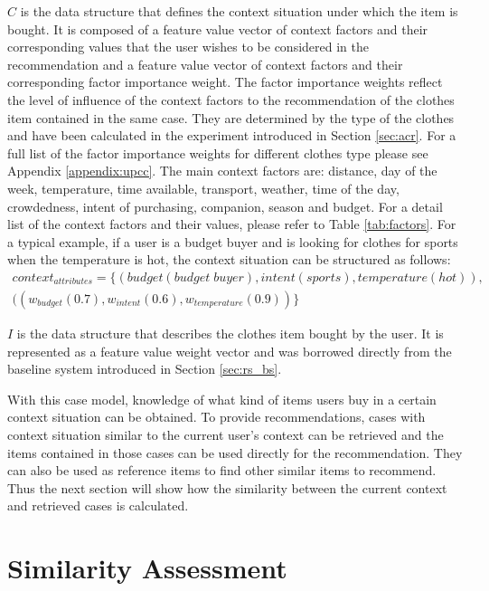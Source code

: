 $C$ is the data structure that defines the context situation under which the item is bought. It is composed of a feature value vector of context factors and their corresponding values that the user wishes to be considered in the recommendation and a feature value vector of context factors and their corresponding factor importance weight. The factor importance weights reflect the level of influence of the context factors to the recommendation of the clothes item contained in the same case. They are determined by the type of the clothes and have been calculated in the experiment introduced in Section \ref{sec:acr}. For a full list of the factor importance weights for different clothes type please see Appendix \ref{appendix:upcc}. The main context factors are: distance, day of the week, temperature, time available, transport, weather, time of the day, crowdedness, intent of purchasing, companion, season and budget. For a detail list of the context factors and their values, please refer to Table \ref{tab:factors}. For a typical example, if a user is a budget buyer and is looking for clothes for sports when the temperature is hot, the context situation can be structured as follows:
\begin{equation} \label{eq:context}
\begin{split}
	{context}_{attributes} = \{(budget (budget\;buyer), intent (sports), temperature (hot)), &\\
	                                            ((w_{budget}(0.7), w_{intent}(0.6), w_{temperature}(0.9))\} &
\end{split}
\end{equation}

$I$ is the data structure that describes the clothes item bought by the user. It is represented as a feature value weight vector \cite{ref:30} and was borrowed directly from the baseline system introduced in Section \ref{sec:rs_bs}. 

With this case model, knowledge of what kind of items users buy in a certain context situation can be obtained. To provide recommendations, cases with context situation similar to the current user's context can be retrieved and the items contained in those cases can be used directly for the recommendation. They can also be used as reference items to find other similar items to recommend. Thus the next section will show how the similarity between the current context and retrieved cases is calculated.

\section{Similarity Assessment} \label{sec:sa}


